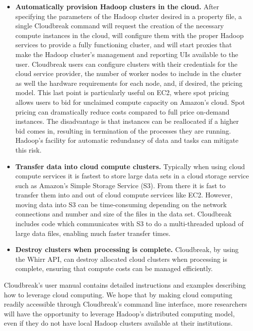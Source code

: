 \begin{itemize}
\item \textbf{Automatically provision Hadoop clusters in the cloud.} After specifying the parameters of the Hadoop cluster desired in a property file, a single Cloudbreak command will request the creation of the necessary compute instances in the cloud, will configure them with the proper Hadoop services to provide a fully functioning cluster, and will start proxies that make the Hadoop cluster's management and reporting UIs available to the user. Cloudbreak users can configure clusters with their credentials for the cloud service provider, the number of worker nodes to include in the cluster as well the hardware requirements for each node, and, if desired, the pricing model. This last point is particularly useful on EC2, where spot pricing allows users to bid for unclaimed compute capacity on Amazon's cloud. Spot pricing can dramatically reduce costs compared to full price on-demand instances. The disadvantage is that instances can be reallocated if a higher bid comes in, resulting in termination of the processes they are running. Hadoop's facility for automatic redundancy of data and tasks can mitigate this risk.

\item \textbf{Transfer data into cloud compute clusters.} Typically when using cloud compute services it is fastest to store large data sets in a cloud storage service such as Amazon's Simple Storage Service (S3). From there it is fast to transfer them into and out of cloud compute services like EC2. However, moving data into S3 can be time-consuming depending on the network connections and number and size of the files in the data set. Cloudbreak includes code which communicates with S3 to do a multi-threaded upload of large data files, enabling much faster transfer times.

\item \textbf{Destroy clusters when processing is complete.} Cloudbreak, by using the Whirr API, can destroy allocated cloud clusters when processing is complete, ensuring that compute costs can be managed efficiently.
\end{itemize}

Cloudbreak's user manual contains detailed instructions and examples describing how to leverage cloud computing. We hope that by making cloud computing readily accessible through Cloudbreak's command line interface, more researchers will have the opportunity to leverage Hadoop's distributed computing model, even if they do not have local Hadoop clusters available at their institutions.
